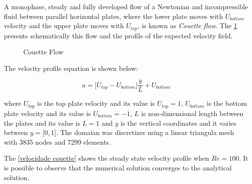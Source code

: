 A monophase, steady and fully developed flow of a 
Newtonian and incompressible fluid between parallel horizontal 
plates, where the lower plate moves with \textit{$U_{bottom}$} 
velocity and the upper plate moves with \textit{$ U_{top}$}, 
is known as \textit{Couette flow}. The \ref{couette}
 presents schematically this flow and the profile of the expected velocity field.

\begin{figure}[H]
\begin{center}
\end{center}
\caption{Couette Flow}
\label{couette}
\end{figure}


\noindent
The velocity profile equation is shown below:

\begin{equation}
 u = \big[ U_{top} - U_{bottom} \big] \frac{y}{L} + U_{bottom}
\end{equation}

\medskip
\noindent
where $U_{top}$ is the top plate velocity and its value is
$U_{top} = 1$, 
$U_{bottom}$ is the bottom plate velocity and its value is
$U_{bottom} = -1$, 
$L$ is non-dimensional length
between the plates and its value is $L = 1$
and $y$ is the vertical coordinates and it varies between 
$y = \big[ 0,1 \big]$.
The domaian was discretizes using a linear triangula mesh with 
3835 nodes and 7299 elements. 

\bigskip
The \ref{velocidade couette} shows the steady state velocity profile
when $Re=100$.
It is possible to observe that the numerical solution 
converges to the analytical solution.

